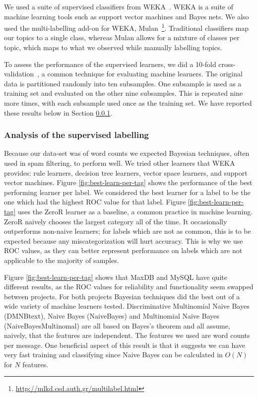 \documentclass[]{sig-alternate}
\begin{document}
We used a suite of supervised classifiers from WEKA~\cite{weka09}. WEKA is a suite of machine learning tools such as support vector machines and Bayes nets. We also used the multi-labelling add-on for WEKA, Mulan~\cite{mulan}\footnote{\url{http://mlkd.csd.auth.gr/multilabel.html}}. Traditional classifiers map our topics to a single class, whereas Mulan allows for a mixture of classes per topic, which maps to what we observed while manually labelling topics.

To assess the performance of the supervised learners, we did a 10-fold cross-validation~\cite{Kohavi1995}, a common technique for evaluating machine learners. The original data is partitioned randomly into ten subsamples. One subsample is used as a training set and evaluated on the other nine subsamples. This is repeated nine more times, with each subsample used once as the training set. We have reported these results below in Section \ref{sec:suplabelling}.

\subsubsection{Analysis of the supervised labelling}
\label{sec:suplabelling}
Because our data-set was of word counts we expected Bayesian techniques, often used in spam filtering, to perform well. We tried other learners that WEKA~\cite{weka09} provides: rule learners, decision tree learners, vector space learners, and support vector machines.  Figure \ref{fig:best-learn-per-tag} shows the performance of the best performing learner per label.  We considered the best learner for a label to be the one which had the highest ROC value for that label. Figure \ref{fig:best-learn-per-tag} uses the ZeroR learner as a baseline, a common practice in machine learning. ZeroR naively chooses the largest category all of the time. It occasionally outperforms non-naive learners; for labels which are not as common, this is to be expected because any miscategorization will hurt accuracy. This is why we use ROC values, as they can better represent performance on labels which are not applicable to the majority of samples.

Figure \ref{fig:best-learn-per-tag} shows that MaxDB and MySQL have quite different results, as the ROC values for reliability and functionality seem swapped between projects. For both projects Bayesian techniques did the best out of a wide variety of machine learners tested. Discriminative Multinomial Naive Bayes (DMNBtext), Naive Bayes (NaiveBayes) and Multinomial Naive Bayes (NaiveBayesMultinomal) are all based on Bayes's theorem and all assume, naively, that the features are independent. The features we used are word counts per message. One beneficial aspect of this result is that it suggests we can have very fast training and classifying  since Naive Bayes can be calculated in $O(N)$ for $N$ features.
\end{document}
